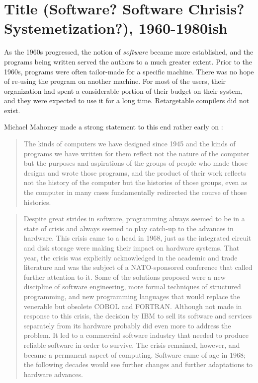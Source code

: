 \chapter{Title (Software? Software Chrisis? Systemetization?), 1960-1980ish}


As the 1960s progressed, the notion of \textit{software} became more established,
and the programs being written served the authors to a much greater extent.
Prior to the 1960s, programs were often tailor-made for a specific machine.
There was no hope of re-using the program on another machine.
For most of the users, their organization had spent a considerable portion
of their budget on their system, and they were expected to use it for a long time.
Retargetable compilers did not exist.

Michael Mahoney made a strong statement to this end rather early on \cite[The Structures of Computation]{the-first-computers-2002}:
\begin{quotation}
The kinds of computers we have
designed since 1945 and the kinds of programs we have written for them reflect not the nature of the
computer but the purposes and aspirations of the groups of people who made those designs and wrote those
programs, and the product of their work reflects not the history of the computer but the histories of those
groups, even as the computer in many cases fundamentally redirected the course of those histories.
\end{quotation}

\begin{quotation}
Despite great strides in software, programming always seemed to be in a state 
of crisis and always seemed to play catch-up to the advances in hardware. This 
crisis came to a head in 1968, just as the integrated circuit and disk storage 
were making their impact on hardware systems. That year, the crisis was 
explicitly acknowledged in the academic and trade literature and was the 
subject of a NATO-sponsored conference that called further attention to it. 
Some of the solutions proposed were a new discipline of software engineering, 
more formal techniques of structured programming, and new programming languages 
that would replace the venerable but obsolete COBOL and FORTRAN. Although not 
made in response to this crisis, the decision by IBM to sell its software and 
services separately from its hardware probably did even more to address the 
problem. It led to a commercial software industry that needed to produce 
reliable software in order to survive. The crisis remained, however, and became 
a permanent aspect of computing. Software came of age in 1968; the following 
decades would see further changes and further adaptations to hardware advances.
\end{quotation}

